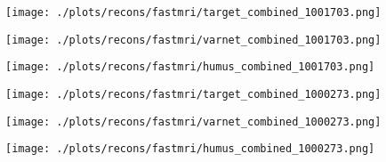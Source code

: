 \begin{figure}[h!]
\begin{minipage}[b]{0.33\textwidth}
		\texttt{[image: ./plots/recons/fastmri/target\_combined\_1001703.png]}
		\addtocounter{figure}{-1}
		\captionsetup{labelformat=empty}
	\end{minipage}
	\begin{minipage}[b]{0.33\textwidth}
		\centering
		\texttt{[image: ./plots/recons/fastmri/varnet\_combined\_1001703.png]}
		\addtocounter{figure}{-1}
		\captionsetup{labelformat=empty}
	\end{minipage}
	\begin{minipage}[b]{0.33\textwidth}
		\centering
		\texttt{[image: ./plots/recons/fastmri/humus\_combined\_1001703.png]}
		\addtocounter{figure}{-1}
		\captionsetup{labelformat=empty}
	\end{minipage} \par\vspace{-0.96cm}
	\begin{minipage}[b]{0.33\textwidth}
		\centering
		\texttt{[image: ./plots/recons/fastmri/target\_combined\_1000273.png]}
		\addtocounter{figure}{-1}
		\captionsetup{labelformat=empty}
		\vspace{-0.5cm}
	\end{minipage}
	\begin{minipage}[b]{0.33\textwidth}
		\centering
		\texttt{[image: ./plots/recons/fastmri/varnet\_combined\_1000273.png]}
		\addtocounter{figure}{-1}
		\captionsetup{labelformat=empty}
		\vspace{-0.5cm}
	\end{minipage}
	\begin{minipage}[b]{0.33\textwidth}
		\centering
		\texttt{[image: ./plots/recons/fastmri/humus\_combined\_1000273.png]}
		\addtocounter{figure}{-1}
		\captionsetup{labelformat=empty}
		\vspace{-0.5cm}
	\end{minipage}  \par\vspace{-0.1cm}
\end{figure}


